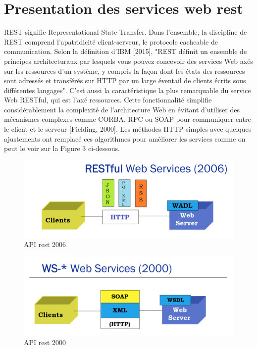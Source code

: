 \section{Presentation des services web rest}
REST signifie Representational State Transfer. Dans l'ensemble, la discipline de REST comprend l'apatridicité client-serveur, le protocole cacheable de communication.
Selon la définition d'IBM [2015], "REST définit un ensemble de principes architecturaux par lesquels vous pouvez concevoir des services Web axés sur les ressources d'un système, y compris la façon dont les états des ressources sont adressés et transférés sur HTTP par un large éventail de clients écrits sous différentes langages". C'est aussi la caractéristique la plus remarquable du service Web RESTful, qui est l'axé ressources. Cette fonctionnalité simplifie considérablement la complexité de l'architecture Web en évitant d'utiliser des mécanismes complexes comme CORBA, RPC ou SOAP pour communiquer entre le client et le serveur [Fielding, 2000]. Les méthodes HTTP simples avec quelques ajustements ont remplacé ces algorithmes pour améliorer les services comme on peut le voir sur la Figure 3 ci-dessous.
\begin{figure}[! ht ]
			\centering
			\includegraphics[scale=.4]{./images/api_rest_2006.png}
			\caption {API rest 2006}
		\end{figure}
\begin{figure}[! ht ]
			\centering
			\includegraphics[scale=.4]{./images/api_2000.png}
			\caption {API rest 2000}
		\end{figure}
		
